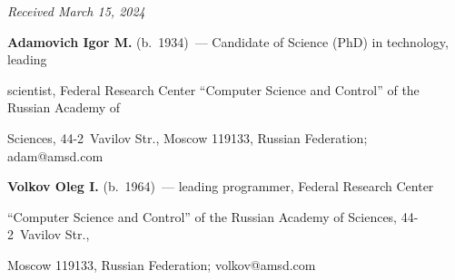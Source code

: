 \vspace*{-6pt}





\hfill{\small\textit{Received March 15, 2024}} 





\vspace*{-10pt} 





\Contr





\vspace*{-3pt}





\noindent


\textbf{Adamovich Igor M.} (b.\ 1934)~--- Candidate of Science (PhD) in technology, leading 


scientist, Federal Research Center ``Computer Science and Control'' of the Russian Academy of 


Sciences, 44-2~Vavilov Str., Moscow 119133, Russian Federation; \mbox{adam@amsd.com}





\vspace*{3pt}





\noindent


\textbf{Volkov Oleg I.} (b.\ 1964)~--- leading programmer, Federal Research Center 


``Computer Science and Control'' of the Russian Academy of Sciences, 44-2~Vavilov Str., 


Moscow 119133, Russian Federation; \mbox{volkov@amsd.com}








  


\label{end\stat}





\renewcommand{\bibname}{\protect\rm Литература} 


